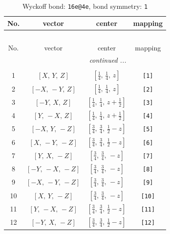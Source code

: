 \documentclass[fleqn,8pt]{jsarticle}
\begin{document}
\begin{longtable}{cccc}
\caption{Wyckoff bond: {\tt 16e@4e}, bond symmetry: {\tt 1}}
 \\
 \hline \hline
No. & vector & center & mapping \\ \hline \endfirsthead

\multicolumn{3}{l}{\tablename\ \thetable{}} \\
 \hline \hline
No. & vector & center & mapping \\ \hline \endhead

 \hline \hline
\multicolumn{3}{r}{\footnotesize\it continued ...} \\ \endfoot

 \hline \hline
\multicolumn{3}{r}{} \\ \endlastfoot

1 & $\left[ X,\, Y,\, Z \right]$ & $\left[ \frac{1}{4},\, \frac{1}{4},\, z \right]$ & {\tt [1]} \\ \hline
2 & $\left[ - X,\, - Y,\, Z \right]$ & $\left[ \frac{1}{4},\, \frac{1}{4},\, z \right]$ & {\tt [2]} \\ \hline
3 & $\left[ - Y,\, X,\, Z \right]$ & $\left[ \frac{1}{4},\, \frac{1}{4},\, z + \frac{1}{2} \right]$ & {\tt [3]} \\ \hline
4 & $\left[ Y,\, - X,\, Z \right]$ & $\left[ \frac{1}{4},\, \frac{1}{4},\, z + \frac{1}{2} \right]$ & {\tt [4]} \\ \hline
5 & $\left[ - X,\, Y,\, - Z \right]$ & $\left[ \frac{3}{4},\, \frac{3}{4},\, \frac{1}{2} - z \right]$ & {\tt [5]} \\ \hline
6 & $\left[ X,\, - Y,\, - Z \right]$ & $\left[ \frac{3}{4},\, \frac{3}{4},\, \frac{1}{2} - z \right]$ & {\tt [6]} \\ \hline
7 & $\left[ Y,\, X,\, - Z \right]$ & $\left[ \frac{3}{4},\, \frac{3}{4},\, - z \right]$ & {\tt [7]} \\ \hline
8 & $\left[ - Y,\, - X,\, - Z \right]$ & $\left[ \frac{3}{4},\, \frac{3}{4},\, - z \right]$ & {\tt [8]} \\ \hline
9 & $\left[ - X,\, - Y,\, - Z \right]$ & $\left[ \frac{3}{4},\, \frac{3}{4},\, - z \right]$ & {\tt [9]} \\ \hline
10 & $\left[ X,\, Y,\, - Z \right]$ & $\left[ \frac{3}{4},\, \frac{3}{4},\, - z \right]$ & {\tt [10]} \\ \hline
11 & $\left[ Y,\, - X,\, - Z \right]$ & $\left[ \frac{3}{4},\, \frac{3}{4},\, \frac{1}{2} - z \right]$ & {\tt [11]} \\ \hline
12 & $\left[ - Y,\, X,\, - Z \right]$ & $\left[ \frac{3}{4},\, \frac{3}{4},\, \frac{1}{2} - z \right]$ & {\tt [12]} \\ \hline

\end{longtable}
\end{document}

